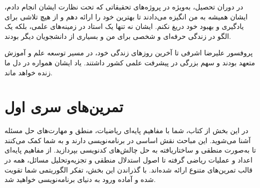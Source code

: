 \documentclass[b5paper,12pt]{article}
\begin{document}
	در دوران تحصیل، به‌ویژه در پروژه‌های تحقیقاتی که تحت نظارت ایشان انجام دادم، ایشان همیشه به من انگیزه می‌دادند تا بهترین خود را ارائه دهم و از هیچ تلاشی برای یادگیری و بهبود خود دریغ نکنم. ایشان نه تنها یک استاد در زمینه‌های علمی، بلکه یک الگو در زندگی حرفه‌ای و شخصی برای من و بسیاری از دانشجویان دیگر بودند.
	
	پروفسور علیرضا اشرفی تا آخرین روزهای زندگی‌ خود، در مسیر توسعه علم و آموزش متعهد بودند و سهم بزرگی در پیشرفت علمی کشور داشتند. یاد ایشان همواره در دل ما زنده خواهد ماند.
	
	
	\newpage
	\section*{تمرین‌های سری اول}
	در این بخش از کتاب، شما با مفاهیم پایه‌ای ریاضیات، منطق و مهارت‌های حل مسئله آشنا می‌شوید. این مباحث نقش اساسی در برنامه‌نویسی دارند و به شما کمک می‌کنند تا به‌صورت منطقی و ساختاریافته به حل چالش‌های کدنویسی بپردازید. از مفاهیم پایه‌ای اعداد و عملیات ریاضی گرفته تا اصول استدلال منطقی و تجزیه‌وتحلیل مسائل، همه در قالب تمرین‌های متنوع ارائه شده‌اند. با گذراندن این بخش، تفکر الگوریتمی شما تقویت شده و آماده ورود به دنیای برنامه‌نویسی خواهید شد.
	
\end{document}
